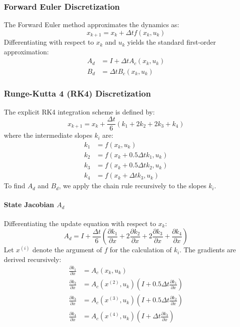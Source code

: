 \subsubsection{Forward Euler Discretization}
The Forward Euler method approximates the dynamics as:
\begin{equation}
    x_{k+1} = x_k + \Delta t f(x_k, u_k)
\end{equation}
Differentiating with respect to $x_k$ and $u_k$ yields the standard first-order approximation:
\begin{align}
    A_d &= I + \Delta t A_c(x_k, u_k) \\
    B_d &= \Delta t B_c(x_k, u_k)
\end{align}

\subsubsection{Runge-Kutta 4 (RK4) Discretization}
The explicit RK4 integration scheme is defined by:
\begin{equation}
    x_{k+1} = x_k + \frac{\Delta t}{6} (k_1 + 2k_2 + 2k_3 + k_4)
\end{equation}
where the intermediate slopes $k_i$ are:
\begin{align*}
    k_1 &= f(x_k, u_k) \\
    k_2 &= f(x_k + 0.5 \Delta t k_1, u_k) \\
    k_3 &= f(x_k + 0.5 \Delta t k_2, u_k) \\
    k_4 &= f(x_k + \Delta t k_3, u_k)
\end{align*}
To find $A_d$ and $B_d$, we apply the chain rule recursively to the slopes $k_i$.

\paragraph{State Jacobian \texorpdfstring{$A_d$}{Ad}}
Differentiating the update equation with respect to $x_k$:
\begin{equation}
    A_d = I + \frac{\Delta t}{6} \left( \frac{\partial k_1}{\partial x} + 2\frac{\partial k_2}{\partial x} + 2\frac{\partial k_3}{\partial x} + \frac{\partial k_4}{\partial x} \right)
\end{equation}
Let $x^{(i)}$ denote the argument of $f$ for the calculation of $k_i$. The gradients are derived recursively:
\begin{align}
    \frac{\partial k_1}{\partial x} &= A_c(x_k, u_k) \label{eq:dk1_dx} \\
    \frac{\partial k_2}{\partial x} &= A_c(x^{(2)}, u_k) \left( I + 0.5 \Delta t \frac{\partial k_1}{\partial x} \right) \\
    \frac{\partial k_3}{\partial x} &= A_c(x^{(3)}, u_k) \left( I + 0.5 \Delta t \frac{\partial k_2}{\partial x} \right) \\
    \frac{\partial k_4}{\partial x} &= A_c(x^{(4)}, u_k) \left( I + \Delta t \frac{\partial k_3}{\partial x} \right)
\end{align}

